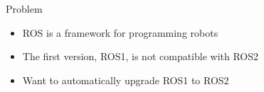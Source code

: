 \documentclass[final]{beamer}
\newlength{\onecolwid}
\begin{document}
\begin{frame}[t]
\begin{columns}[t]
\begin{column}{\onecolwid}
\begin{alertblock}{Problem}
\begin{itemize}
\item ROS is a framework for programming robots
\item The first version, ROS1, is not compatible with ROS2
\item Want to automatically upgrade ROS1 to ROS2
\end{itemize}

\end{alertblock}





\end{column}
\end{columns}
\end{frame}
\end{document}
